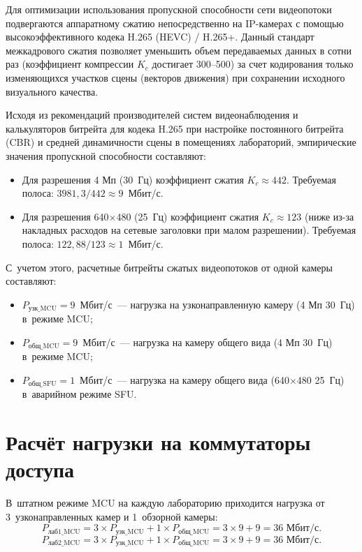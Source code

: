 \documentclass{bmstu}
\begin{document}
Для оптимизации использования пропускной способности сети видеопотоки подвергаются аппаратному сжатию непосредственно на IP-камерах с помощью высокоэффективного кодека H.265 (HEVC) / H.265+. Данный стандарт межкадрового сжатия позволяет уменьшить объем передаваемых данных в сотни раз (коэффициент компрессии $K_c$ достигает 300--500) за счет кодирования только изменяющихся участков сцены (векторов движения) при сохранении исходного визуального качества.

Исходя из рекомендаций производителей систем видеонаблюдения и калькуляторов битрейта для кодека H.265 при настройке постоянного битрейта (CBR) и средней динамичности сцены в помещениях лабораторий, эмпирические значения пропускной способности составляют:
\begin{itemize}
    \item Для разрешения 4 Мп (30~Гц) коэффициент сжатия $K_c \approx 442$. Требуемая полоса: $3981{,}3 / 442 \approx 9$~Мбит/с.
    \item Для разрешения 640$\times$480 (25~Гц) коэффициент сжатия $K_c \approx 123$ (ниже из-за накладных расходов на сетевые заголовки при малом разрешении). Требуемая полоса: $122{,}88 / 123 \approx 1$~Мбит/с.
\end{itemize}

С~учетом этого, расчетные битрейты сжатых видеопотоков от одной камеры составляют:
\begin{itemize}
    \item $P_{\text{узк\_MCU}} = 9$~Мбит/с~--- нагрузка на узконаправленную камеру (4 Мп 30~Гц) в~режиме MCU;
    \item $P_{\text{общ\_MCU}} = 9$~Мбит/с~--- нагрузка на камеру общего вида (4 Мп 30~Гц) в~режиме MCU;
    \item $P_{\text{общ\_SFU}} = 1$~Мбит/с~--- нагрузка на камеру общего вида (640$\times$480 25~Гц) в~аварийном режиме SFU.
\end{itemize}

\section{Расчёт нагрузки на коммутаторы доступа}

В~штатном режиме MCU на каждую лабораторию приходится нагрузка от 3~узконаправленных камер и 1~обзорной камеры:
\begin{equation}
    P_{\text{лаб1\_MCU}} = 3 \times P_{\text{узк\_MCU}} + 1 \times P_{\text{общ\_MCU}} = 3 \times 9 + 9 = 36 \text{ Мбит/с}.
    \label{eq:p_lab1}
\end{equation}
\begin{equation}
    P_{\text{лаб2\_MCU}} = 3 \times P_{\text{узк\_MCU}} + 1 \times P_{\text{общ\_MCU}} = 3 \times 9 + 9 = 36 \text{ Мбит/с}.
    \label{eq:p_lab2}
\end{equation}
\end{document}

